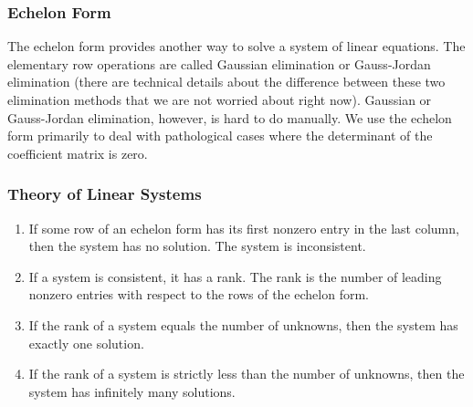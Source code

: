 \documentclass[xcolor=dvipsnames]{beamer}
\begin{document}
\begin{frame}
  \frametitle{Echelon Form}
  The echelon form provides another way to solve a system of linear
  equations. The elementary row operations are called \alert{Gaussian
    elimination} or \alert{Gauss-Jordan elimination} (there are
  technical details about the difference between these two elimination
  methods that we are not worried about right now). Gaussian or
  Gauss-Jordan elimination, however, is hard to do manually. We use
  the echelon form primarily to deal with pathological cases where the
  determinant of the coefficient matrix is zero.
\end{frame}

\begin{frame}
  \frametitle{Theory of Linear Systems}
  \begin{enumerate}
  \item If some row of an echelon form has its first nonzero entry in
    the last column, then the system has no solution. The system is
    \alert{inconsistent}. 
  \item If a system is consistent, it has a \alert{rank}. The rank is
    the number of leading nonzero entries with respect to the rows of
    the echelon form.
  \item If the rank of a system equals the number of unknowns, then
    the system has exactly one solution.
  \item If the rank of a system is strictly less than the number of
    unknowns, then the system has infinitely many solutions.
  \end{enumerate}
\end{frame}
\end{document}
